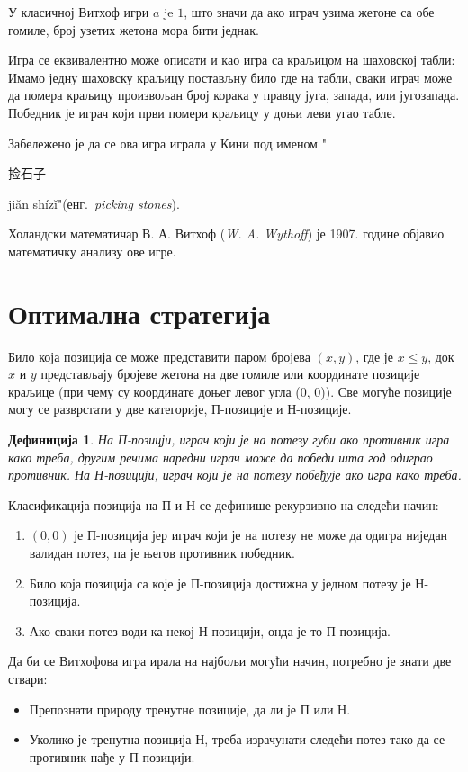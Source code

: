 \documentclass[a4paper]{article}
\newtheorem{definition}{Дефиниција}
\begin{document}
У класичној Витхоф игри $ a $ je $ 1 $, што значи да ако играч узима жетоне са обе гомиле, број узетих жетона мора бити једнак.

Игра се еквивалентно може описати и као игра са краљицом на шаховској табли: Имамо једну шаховску краљицу постављну било где на табли, сваки играч може да помера краљицу произвољан број корака у правцу југа, запада, или југозапада. Победник је играч који први помери краљицу у доњи леви угао табле.\cite{cut-the-knot, singingbanana-youtube}

Забележено је да се ова игра играла у Кини  под именом "\begin{CJK}{UTF8}{gbsn}捡石子\end{CJK} jiǎn shízǐ"(енг.{~\em picking stones}). \cite{Yaglom}

Холандски математичар В. А. Витхоф ({\em W. A. Wythoff}) је 1907. године објавио математичку анализу ове игре. \cite{wythoff1907modification}

\section{Оптимална стратегија}
\label{sec:optimalna_strategija}

Било која позиција се може представити паром бројева $ (x, y) $, где је $ x \le  y $, док  $ x $ и $ y $ представљају бројеве жетона на две гомиле или координате позиције краљице (при чему су координате доњег левог угла (0, 0)). Све могуће позиције могу се разврстати у две категорије, П-позиције и Н-позиције. 
\begin{definition}
	На П-позицји, играч који је на потезу губи ако противник игра како треба, другим речима наредни играч може да победи шта год одиграо противник. На Н-позицији, играч који је на потезу побеђује ако игра како треба.
\end{definition}

Класификација позиција на П и Н се дефинише рекурзивно на следећи начин:
\begin{enumerate}
	\item $ (0, 0) $ је П-позиција јер играч који је на потезу не може да одигра ниједан валидан потез, па је његов противник победник.
	\item Било која позиција са које је П-позиција достижна у једном потезу је Н-позиција. 
	\item Ако сваки потез води ка некој Н-позицији, онда је то П-позиција.
\end{enumerate}

Да би се Витхофова игра ирала на најбољи могући начин, потребно је знати две ствари:
\begin{itemize}
	\item Препознати природу тренутне позиције, да ли је П или Н.
	\item Уколико је тренутна позиција Н, треба израчунати следећи потез тако да се противник нађе у П позицији.
\end{itemize}
\end{document}
